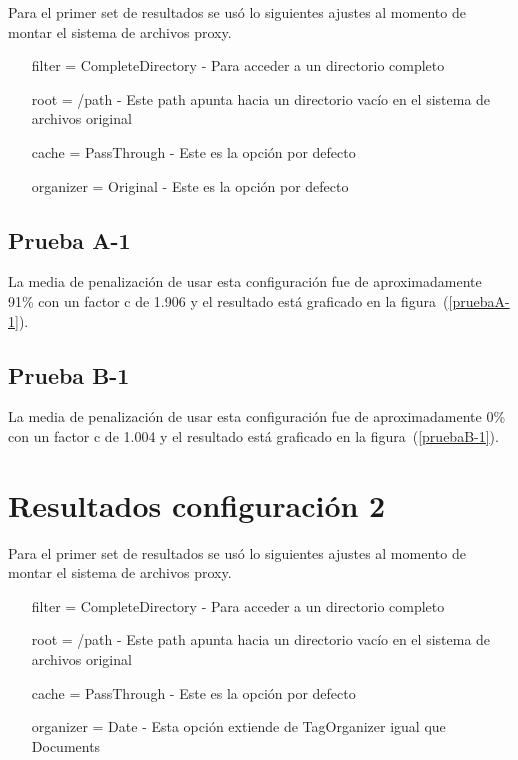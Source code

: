 Para el primer set de resultados se usó lo siguientes ajustes al momento de montar el sistema de archivos proxy.

\begin{itemize}
\item[filter] = CompleteDirectory - Para acceder a un directorio completo
\item[root] = /path - Este path apunta hacia un directorio vacío en el sistema de archivos original
\item[cache] = PassThrough - Este es la opción por defecto
\item[organizer] = Original - Este es la opción por defecto
\end{itemize}

\subsection{Prueba A-1}

La media de penalización de usar esta configuración fue de aproximadamente 91\% con un factor c de 1.906 y el resultado está graficado en la figura~(\ref{pruebaA-1}).


\subsection{Prueba B-1}

La media de penalización de usar esta configuración fue de aproximadamente 0\% con un factor c de 1.004 y el resultado está graficado en la figura~(\ref{pruebaB-1}).



\section{Resultados configuración 2}

Para el primer set de resultados se usó lo siguientes ajustes al momento de montar el sistema de archivos proxy.

\begin{itemize}
\item[filter] = CompleteDirectory - Para acceder a un directorio completo
\item[root] = /path - Este path apunta hacia un directorio vacío en el sistema de archivos original
\item[cache] = PassThrough - Este es la opción por defecto
\item[organizer] = Date - Esta opción extiende de TagOrganizer igual que Documents
\end{itemize}

